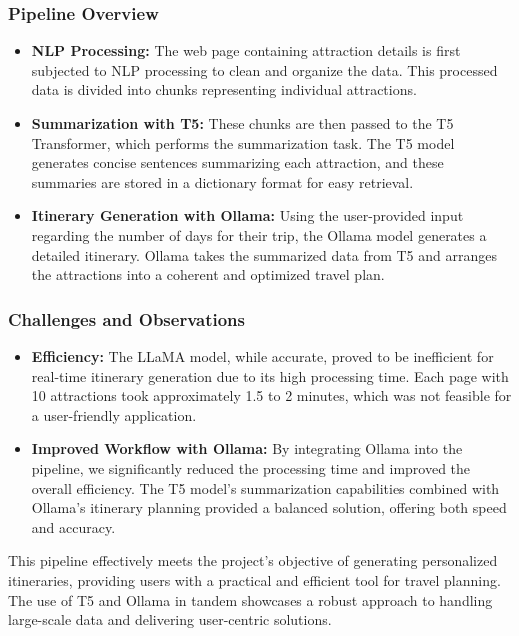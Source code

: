 \documentclass[conference]{IEEEtran}
\begin{document}
        \subsubsection{Pipeline Overview}
            \begin{itemize}
                \item \textbf{NLP Processing:} The web page containing attraction details is first subjected to NLP processing to clean and organize the data. This processed data is divided into chunks representing individual attractions.
                \item \textbf{Summarization with T5:} These chunks are then passed to the T5 Transformer, which performs the summarization task. The T5 model generates concise sentences summarizing each attraction, and these summaries are stored in a dictionary format for easy retrieval.
                \item \textbf{Itinerary Generation with Ollama:} Using the user-provided input regarding the number of days for their trip, the Ollama model generates a detailed itinerary. Ollama takes the summarized data from T5 and arranges the attractions into a coherent and optimized travel plan.
            \end{itemize}
        
        \subsubsection{Challenges and Observations}
            \begin{itemize}
                \item \textbf{Efficiency:} The LLaMA model, while accurate, proved to be inefficient for real-time itinerary generation due to its high processing time. Each page with 10 attractions took approximately 1.5 to 2 minutes, which was not feasible for a user-friendly application.
                \item \textbf{Improved Workflow with Ollama:} By integrating Ollama into the pipeline, we significantly reduced the processing time and improved the overall efficiency. The T5 model's summarization capabilities combined with Ollama's itinerary planning provided a balanced solution, offering both speed and accuracy.
            \end{itemize}
        
        This pipeline effectively meets the project's objective of generating personalized itineraries, providing users with a practical and efficient tool for travel planning. The use of T5 and Ollama in tandem showcases a robust approach to handling large-scale data and delivering user-centric solutions.
        
\end{document}
